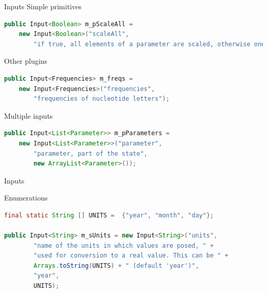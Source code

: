 \documentclass{beamer}
\theoremstyle{definition}
\begin{document}
\begin{frame}[containsverbatim]
{Inputs}
Simple primitives

\begin{lstlisting}[language=java]
public Input<Boolean> m_pScaleAll = 
    new Input<Boolean>("scaleAll", 
        "if true, all elements of a parameter are scaled, otherwise one is randomly selected");
\end{lstlisting}

Other plugins

\begin{lstlisting}[language=java]
public Input<Frequencies> m_freqs = 
    new Input<Frequencies>("frequencies", 
        "frequencies of nucleotide letters");
\end{lstlisting}

Multiple inputs

\begin{lstlisting}[language=java]
public Input<List<Parameter>> m_pParameters = 
    new Input<List<Parameter>>("parameter", 
        "parameter, part of the state",
        new ArrayList<Parameter>());
\end{lstlisting}
\end{frame}

\begin{frame}[containsverbatim]
{Inputs}

Enumerations

\begin{lstlisting}[language=java]
final static String [] UNITS =  {"year", "month", "day"};

public Input<String> m_sUnits = new Input<String>("units", 
        "name of the units in which values are posed, " +
		"used for conversion to a real value. This can be " + 
        Arrays.toString(UNITS) + " (default 'year')", 
        "year", 
        UNITS);
\end{lstlisting}
\end{frame}
\end{document}
